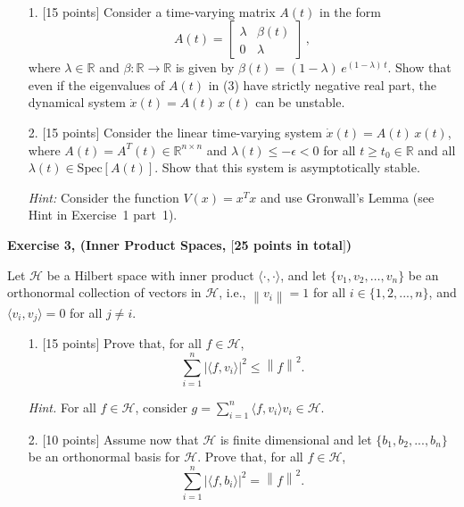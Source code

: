 \documentclass[a4paper,10.5pt]{article}
\newcommand{\R}{\mathbb{R}}
\begin{document}
 \\

\clearpage


\begin{itemize}
\item[1.] $[$15 points$]$  Consider a time-varying matrix $A(t)$ in the form
\begin{equation}
A(t) = \begin{bmatrix}\lambda & \beta(t)\\ 0 & \lambda\end{bmatrix}\,, \tag{3}
\end{equation}
where $\lambda \in \mathbb{R}$ and $\beta\colon \R \to \mathbb{R}$ is given by $\beta(t) = ({1 - \lambda})\, e^{(1 - \lambda)\, t}$. Show that even if the eigenvalues of $A(t)$ in (3) have strictly negative real part,  the dynamical system $\dot{x}(t) = A(t)\, x(t)$ can be unstable.


\item[2.] $[$15 points$]$ Consider the linear time-varying system $\dot{x}(t) = A(t)\, x(t)$, where $A(t) = A^T(t) \in \R^{n \times n}$ and $\lambda(t) \leq -\epsilon < 0$ for all $t \geq t_0 \in \mathbb{R}$ and all $\lambda(t) \in \text{Spec}[A(t)]$. Show that this system is asymptotically stable.

{\em Hint:} Consider the function $V(x)=x^Tx$ and use Gronwall's Lemma (see Hint in Exercise~1 part~1).
\end{itemize} 

\clearpage

{\bf Exercise 3, (Inner Product Spaces, $[$25 points in total$]$)}

Let $\mathcal{H}$ be a Hilbert space with inner product $ \langle \cdot, \cdot \rangle$, and let $\{ v_1, v_2, \ldots, v_n \}$ be an orthonormal collection of vectors in $\mathcal{H}$, i.e., $\left\| v_i \right\| = 1$ for all $i \in \{1, 2, ..., n\}$, and $\langle v_i, v_j\rangle = 0$ for all $j \neq i$.

\begin{itemize}
\item[1.] $[$15 points$]$ Prove that, for all $f \in \mathcal{H}$, 
$$ \sum_{ i=1 }^{n} | \langle  f, v_i \rangle |^2  \leq \left\| f \right\|^2.$$

\textit{Hint.} For all $f \in \mathcal{H}$, consider $g = \sum_{ i=1 }^{n} \langle f, v_i \rangle v_i \in \mathcal{H}$.

\item[2.] $[$10 points$]$ Assume now that $\mathcal{H}$ is finite dimensional and let $\{b_1, b_2, ..., b_n\}$ be an orthonormal basis for $\mathcal{H}$. Prove that, for all $f \in \mathcal{H}$,
$$ \sum_{ i=1 }^{n} | \langle  f, b_i \rangle |^2  = \left\| f \right\|^2.$$
\end{itemize}
\end{document}

